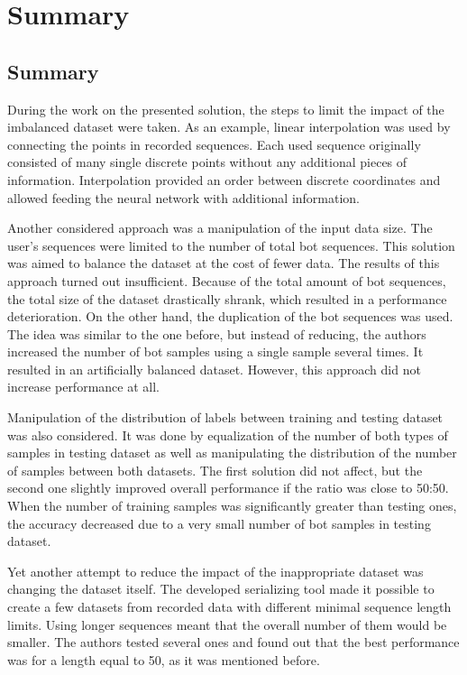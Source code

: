 \chapter{Summary}\label{ch:summary}

\section{Summary}\label{sec:summary}
During the work on the presented solution, the steps to limit the impact of the imbalanced dataset were taken.
As an example, linear interpolation was used by connecting the points in recorded sequences.
Each used sequence originally consisted of many single discrete points without any additional pieces of information.
Interpolation provided an order between discrete coordinates and allowed feeding the neural network with additional information.

Another considered approach was a manipulation of the input data size.
The user's sequences were limited to the number of total bot sequences.
This solution was aimed to balance the dataset at the cost of fewer data.
The results of this approach turned out insufficient.
Because of the total amount of bot sequences, the total size of the dataset drastically shrank, which resulted in a performance deterioration.
On the other hand, the duplication of the bot sequences was used.
The idea was similar to the one before, but instead of reducing, the authors increased the number of bot samples using a single sample several times.
It resulted in an artificially balanced dataset.
However, this approach did not increase performance at all.

Manipulation of the distribution of labels between training and testing dataset was also considered.
It was done by equalization of the number of both types of samples in testing dataset as well as manipulating the distribution of the number of samples between both datasets.
The first solution did not affect, but the second one slightly improved overall performance if the ratio was close to \num{50}:\num{50}.
When the number of training samples was significantly greater than testing ones, the accuracy decreased due to a very small number of bot samples in testing dataset.

Yet another attempt to reduce the impact of the inappropriate dataset was changing the dataset itself.
The developed serializing tool made it possible to create a few datasets from recorded data with different minimal sequence length limits.
Using longer sequences meant that the overall number of them would be smaller.
The authors tested several ones and found out that the best performance was for a length equal to \num{50}, as it was mentioned before.


